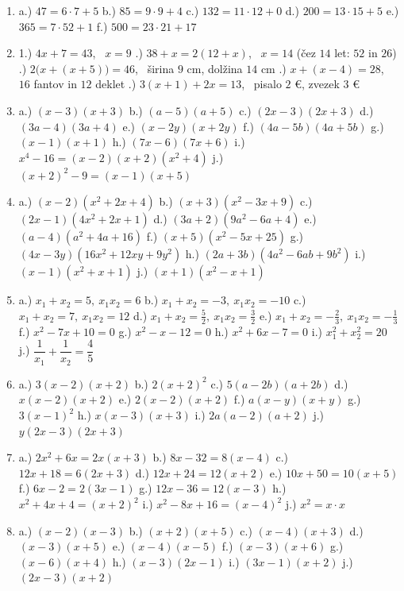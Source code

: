 \documentclass[a4paper,12pt]{letter}
\begin{document}
\begin{enumerate}
\item a.) $47=6\cdot7+5$ \quad b.) $85=9\cdot9+4$ \quad c.) $132=11\cdot12+0$ \quad
      d.) $200=13\cdot15+5$ \quad e.) $365=7\cdot52+1$ \quad f.) $500=23\cdot21+17$

\item 1.) $4x+7=43$, \ $x=9$ .) $38+x=2(12+x)$, \ $x=14$ (\v{c}ez $14$ let: $52$ in $26$) .) $2\big(x+(x+5)\big)=46$, \ \v{s}irina $9$ cm, dol\v{z}ina $14$ cm .) $x+(x-4)=28$, \ $16$ fantov in $12$ deklet .) $3(x+1)+2x=13$, \ pisalo $2$ \euro{}, zvezek $3$ \euro{}

\item a.) $(x-3)(x+3)$ \quad b.) $(a-5)(a+5)$ \quad c.) $(2x-3)(2x+3)$ \quad
      d.) $(3a-4)(3a+4)$ \quad e.) $(x-2y)(x+2y)$ \quad f.) $(4a-5b)(4a+5b)$ \quad
      g.) $(x-1)(x+1)$ \quad h.) $(7x-6)(7x+6)$ \quad i.) $x^4-16=(x-2)(x+2)(x^2+4)$ \quad
      j.) $(x+2)^2-9=(x-1)(x+5)$

\item a.) $(x-2)(x^2+2x+4)$ \quad b.) $(x+3)(x^2-3x+9)$ \quad c.) $(2x-1)(4x^2+2x+1)$ \quad
      d.) $(3a+2)(9a^2-6a+4)$ \quad e.) $(a-4)(a^2+4a+16)$ \quad f.) $(x+5)(x^2-5x+25)$ \quad
      g.) $(4x-3y)(16x^2+12xy+9y^2)$ \quad h.) $(2a+3b)(4a^2-6ab+9b^2)$ \quad
      i.) $(x-1)(x^2+x+1)$ \quad j.) $(x+1)(x^2-x+1)$

\item a.) $x_1+x_2=5,\ x_1x_2=6$ \quad b.) $x_1+x_2=-3,\ x_1x_2=-10$ \quad
      c.) $x_1+x_2=7,\ x_1x_2=12$ \quad d.) $x_1+x_2=\frac{5}{2},\ x_1x_2=\frac{3}{2}$ \quad
      e.) $x_1+x_2=-\frac{2}{3},\ x_1x_2=-\frac{1}{3}$ \quad f.) $x^2-7x+10=0$ \quad
      g.) $x^2-x-12=0$ \quad h.) $x^2+6x-7=0$ \quad i.) $x_1^2+x_2^2=20$ \quad
      j.) $\dfrac{1}{x_1}+\dfrac{1}{x_2}=\dfrac{4}{5}$

\item a.) $3(x-2)(x+2)$ \quad b.) $2(x+2)^2$ \quad c.) $5(a-2b)(a+2b)$ \quad
      d.) $x(x-2)(x+2)$ \quad e.) $2(x-2)(x+2)$ \quad f.) $a(x-y)(x+y)$ \quad
      g.) $3(x-1)^2$ \quad h.) $x(x-3)(x+3)$ \quad i.) $2a(a-2)(a+2)$ \quad
      j.) $y(2x-3)(2x+3)$

\item a.) $2x^2+6x=2x(x+3)$ \quad b.) $8x-32=8(x-4)$ \quad c.) $12x+18=6(2x+3)$ \quad
      d.) $12x+24=12(x+2)$ \quad e.) $10x+50=10(x+5)$ \quad f.) $6x-2=2(3x-1)$ \quad
      g.) $12x-36=12(x-3)$ \quad h.) $x^2+4x+4=(x+2)^2$ \quad i.) $x^2-8x+16=(x-4)^2$ \quad
      j.) $x^2=x\cdot x$

\item a.) $(x-2)(x-3)$ \quad b.) $(x+2)(x+5)$ \quad c.) $(x-4)(x+3)$ \quad d.) $(x-3)(x+5)$ \quad
      e.) $(x-4)(x-5)$ \quad f.) $(x-3)(x+6)$ \quad g.) $(x-6)(x+4)$ \quad h.) $(x-3)(2x-1)$ \quad
      i.) $(3x-1)(x+2)$ \quad j.) $(2x-3)(x+2)$


\end{enumerate}
\end{document}

